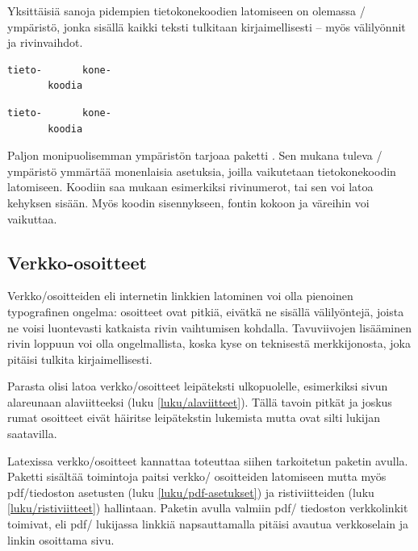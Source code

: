 \noindent
Yksittäisiä sanoja pidempien tietokonekoodien latomiseen on olemassa
\-/ ympäristö, jonka sisällä kaikki teksti
tulkitaan kirjaimellisesti -- myös välilyönnit ja rivinvaihdot.

\begin{koodilohkosis}
\begin{verbatim}
tieto-       kone-
       koodia
\end{verbatim}
\end{koodilohkosis}

\begin{tulossis}
\begin{verbatim}
tieto-       kone-
       koodia
\end{verbatim}
\end{tulossis}

\noindent
Paljon monipuolisemman ympäristön tarjoaa paketti
. Sen mukana tuleva \-/
ympäristö ymmärtää monenlaisia asetuksia, joilla vaikutetaan
tietokonekoodin latomiseen. Koodiin saa mukaan esimerkiksi rivinumerot,
tai sen voi latoa kehyksen sisään. Myös koodin sisennykseen, fontin
kokoon ja väreihin voi vaikuttaa.

\subsection{Verkko-osoitteet}

Verkko\-/osoitteiden eli internetin linkkien latominen voi olla
pienoinen typografinen ongelma: osoitteet ovat pitkiä, eivätkä ne
sisällä välilyöntejä, joista ne voisi luontevasti katkaista rivin
vaihtumisen kohdalla. Tavuviivojen lisääminen rivin loppuun voi olla
ongelmallista, koska kyse on teknisestä merkkijonosta, joka pitäisi
tulkita kirjaimellisesti.

Parasta olisi latoa verkko\-/osoitteet leipäteksti ulkopuolelle,
esimerkiksi sivun alareunaan alaviitteeksi (luku
\ref{luku/alaviitteet}). Tällä tavoin pitkät ja joskus rumat osoitteet
eivät häiritse leipätekstin lukemista mutta ovat silti lukijan
saatavilla.

Latexissa verkko\-/osoitteet kannattaa toteuttaa siihen tarkoitetun
paketin avulla. Paketti  sisältää toimintoja
paitsi verkko\-/ osoitteiden latomiseen mutta myös pdf\-/tiedoston
asetusten (luku \ref{luku/pdf-asetukset}) ja ristiviitteiden (luku
\ref{luku/ristiviitteet}) hallintaan. Paketin avulla valmiin pdf\-/
tiedoston verkkolinkit toimivat, eli pdf\-/ lukijassa linkkiä
napsauttamalla pitäisi avautua verkkoselain ja linkin osoittama sivu.

